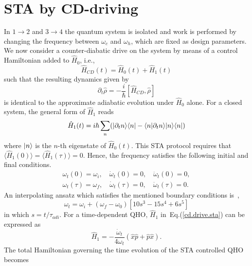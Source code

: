 \documentclass[aps,pra,twocolumn,showpacs,showkeys,groupedaddress,nobalancelastpage,nofootinbib,floatfix,superscriptaddress,longbibliography]{revtex4-2}
\begin{document}
\section{STA by CD-driving}
\label{sec:sta}
In $1\rightarrow 2$ and $3\rightarrow 4$ the quantum system is isolated and work is performed by changing the frequency between $\omega_c$ and $\omega_h$, which are fixed as design parameters. We now consider a counter-diabatic drive on the system by means of a control Hamiltonian added to $\hat{H}_0$, i.e.,
\begin{equation}\label{cd.ham.sta}
\hat{H}_{CD}(t) = \hat{H}_0(t) + \hat{H}_1(t)
\end{equation}
such that the resulting dynamics given by
\begin{equation}\label{eq.mo.sta}
   \partial_t{\hat{\rho}} = -\frac{i}{\hbar}[\hat{H}_{CD},\hat{\rho}]
\end{equation}
is identical to the approximate adiabatic evolution under $\hat{H}_0$ alone. 
For a closed system, the general form of $\hat{H}_1$ reads~\cite{Berry_2009}
\begin{equation}\label{cd.drive.sta}
 \hat{H}_1(t) = i\hbar \sum_n (|\partial_t n\rangle\langle n| - \langle n|\partial_t n\rangle|n\rangle\langle n|)
\end{equation}
where $|n\rangle$ is the $n$-th eigenstate of $\hat{H}_0(t)$. This STA protocol requires that $\langle \hat{H}_1(0)\rangle = \langle \hat{H}_1(\tau)\rangle = 0$. Hence, the frequency satisfies the following initial and final conditions.
\begin{align}\label{bc.sta}
  \omega_t(0)=\omega_i,\quad \dot{\omega}_t(0)=0, \quad \ddot{\omega}_t(0)=0,\nonumber  \\
  \omega_t(\tau)=\omega_f,\quad \dot{\omega}_t(\tau)=0, \quad \ddot{\omega}_t(\tau)=0.
\end{align}
An interpolating ansatz which satisfies the mentioned boundary conditions is~\cite{PhysRevX.4.021013},
\begin{equation}\label{freq.ansazt.sta}
   \omega_t = \omega_i + (\omega_f - \omega_0)[10s^3-15s^4+6s^5]
\end{equation}
in which $s=t/\tau_{adi}$. For a time-dependent QHO, $\hat{H}_1$ in~Eq.(\ref{cd.drive.sta}) can be expressed as~\cite{Muga_2010}
\begin{equation}\label{qho.h1.sta}
\hat{H}_1 = -\frac{\dot{\omega}_t}{4\omega_t}(\hat{x}\hat{p}+\hat{p}\hat{x}).
\end{equation}
The total Hamiltonian governing the time evolution of the STA controlled QHO becomes
\end{document}
